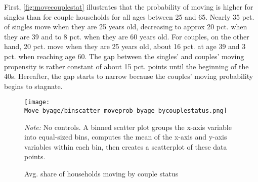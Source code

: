 First, \autoref{fig:movecouplestat} illustrates that the probability of moving is higher for singles than for couple households for all ages between 25 and 65. Nearly 35 pct. of singles move when they are 25 years old, decreasing to approx 20 pct. when they are 39 and to 8 pct. when they are 60 years old. For couples, on the other hand, 20 pct. move when they are 25 years old, about 16 pct. at age 39 and 3 pct. when reaching age 60. The gap between the singles' and couples' moving propensity is rather constant of about 15 pct. points until the beginning of the 40s. Hereafter, the gap starts to narrow because the couples' moving probability begins to stagnate.  
\begin{figure}[!htb]
\centering
\begin{minipage}{0.8\textwidth}
\texttt{[image: Move\_byage/binscatter\_moveprob\_byage\_bycouplestatus.png]} 
{\tiny \emph{Note:} No controls. A binned scatter plot groups the x-axis variable into equal-sized bins, computes the mean of the x-axis and y-axis variables within each bin, then creates a scatterplot of these data points. \\ \par}
\end{minipage}
\caption{Avg. share of households moving by couple status}
\label{fig:movecouplestat}
\end{figure}

